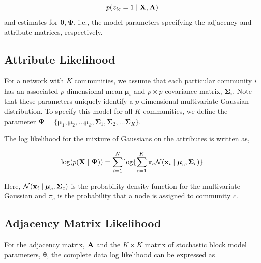 \documentclass[10pt,journal,compsoc]{IEEEtran}
\begin{document}
\begin{equation}
\label{post}
p(z_{ic}=1\mid {\bf X,A})
\end{equation} 
and estimates for ${\boldsymbol \theta, \boldsymbol \Psi}$, i.e., the model parameters specifying the adjacency and attribute matrices, respectively. 

\subsection{Attribute Likelihood}

For a network with $K$ communities, we assume that each particular community $i$ has an associated $p$-dimensional mean ${\boldsymbol \mu}_{i}$ and $p \times p$ covariance matrix, ${\boldsymbol \Sigma}_{i}$. Note that these parameters uniquely identify a $p$-dimensional multivariate Gaussian distribution. To specify this model for all $K$ communities, we define the parameter ${\boldsymbol \Psi}=\{{\boldsymbol \mu}_{1},{\boldsymbol \mu}_{2},\dots {\boldsymbol \mu}_{k},{\boldsymbol \Sigma}_{1},{\boldsymbol \Sigma}_{2},\dots {\boldsymbol \Sigma}_{K}\}$. 

The log likelihood for the mixture of Gaussians on the attributes is written as,

\begin{equation}
\log(p({\bf X} \mid {\boldsymbol \Psi}))=\sum_{i=1}^{N}\log\{\sum_{c=1}^{K}\pi_{c}\mathcal{N}({\bf x}_{i}\mid {\boldsymbol \mu}_{c},{\boldsymbol \Sigma}_{c})   \}
\end{equation}

%
Here, $\mathcal{N}({\bf x}_{i} \mid {\boldsymbol \mu}_{c},{\boldsymbol \Sigma}_{c})$ is the probability density function for the multivariate Gaussian and $\pi_{c}$ is the probability that a node is assigned to community $c$.

\subsection{Adjacency Matrix Likelihood}
For the adjacency matrix, ${\bf A}$ and the $K \times K$ matrix of stochastic block model parameters, ${\boldsymbol \theta}$, the complete data log likelihood can be expressed as
\end{document}
